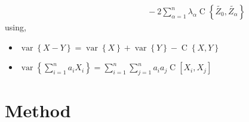 \documentclass[twocolumn]{article}
\numberwithin{equation}{section}
\begin{document}
\begin{itemize}
\begin{align}
						& \quad \quad \quad \quad \quad \quad  \quad \quad  \quad - 2 \sum_{\alpha=1}^n \lambda_\alpha \operatorname{C}\left\{\tilde{Z_0}, \tilde{Z_\alpha}\right\}
	\end{align}
	using,
	\begin{itemize}
		\item $\operatorname{var}\left\{ X -Y \right\} = \operatorname{var}\left\{ X \right\} + \operatorname{var}\left\{ Y \right\} - \operatorname{C}\left\{ X,Y \right\}$
		\item $\operatorname{var}\left\{ \sum_{i=1}^{n} a_iX_i\right\} = \sum_{i=1}^{n} \sum_{j=1}^{n} a_i a_j \operatorname{C}[X_i,X_j]$
	\end{itemize}
\end{itemize}

\section{Method}
\end{document}

